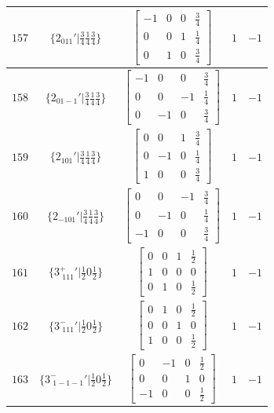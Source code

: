 \documentclass[fleqn,8pt]{jsarticle}
\begin{document}
\begin{longtable}{ccccc}
$ 157 $ & $ \{2{}_{011}{}'|\frac{3}{4} \frac{1}{4} \frac{3}{4}\} $ & $ \begin{bmatrix} -1 & 0 & 0 & \frac{3}{4} \\ 0 & 0 & 1 & \frac{1}{4} \\ 0 & 1 & 0 & \frac{3}{4} \end{bmatrix} $ & $ 1 $ & $ -1 $ \\ \hline
$ 158 $ & $ \{2{}_{01-1}{}'|\frac{3}{4} \frac{1}{4} \frac{3}{4}\} $ & $ \begin{bmatrix} -1 & 0 & 0 & \frac{3}{4} \\ 0 & 0 & -1 & \frac{1}{4} \\ 0 & -1 & 0 & \frac{3}{4} \end{bmatrix} $ & $ 1 $ & $ -1 $ \\ \hline
$ 159 $ & $ \{2{}_{101}{}'|\frac{3}{4} \frac{1}{4} \frac{3}{4}\} $ & $ \begin{bmatrix} 0 & 0 & 1 & \frac{3}{4} \\ 0 & -1 & 0 & \frac{1}{4} \\ 1 & 0 & 0 & \frac{3}{4} \end{bmatrix} $ & $ 1 $ & $ -1 $ \\ \hline
$ 160 $ & $ \{2{}_{-101}{}'|\frac{3}{4} \frac{1}{4} \frac{3}{4}\} $ & $ \begin{bmatrix} 0 & 0 & -1 & \frac{3}{4} \\ 0 & -1 & 0 & \frac{1}{4} \\ -1 & 0 & 0 & \frac{3}{4} \end{bmatrix} $ & $ 1 $ & $ -1 $ \\ \hline
$ 161 $ & $ \{3^{+}_{\,\,111}{}'|\frac{1}{2} 0 \frac{1}{2}\} $ & $ \begin{bmatrix} 0 & 0 & 1 & \frac{1}{2} \\ 1 & 0 & 0 & 0 \\ 0 & 1 & 0 & \frac{1}{2} \end{bmatrix} $ & $ 1 $ & $ -1 $ \\ \hline
$ 162 $ & $ \{3^{-}_{\,\,111}{}'|\frac{1}{2} 0 \frac{1}{2}\} $ & $ \begin{bmatrix} 0 & 1 & 0 & \frac{1}{2} \\ 0 & 0 & 1 & 0 \\ 1 & 0 & 0 & \frac{1}{2} \end{bmatrix} $ & $ 1 $ & $ -1 $ \\ \hline
$ 163 $ & $ \{3^{-}_{\,\,1-1-1}{}'|\frac{1}{2} 0 \frac{1}{2}\} $ & $ \begin{bmatrix} 0 & -1 & 0 & \frac{1}{2} \\ 0 & 0 & 1 & 0 \\ -1 & 0 & 0 & \frac{1}{2} \end{bmatrix} $ & $ 1 $ & $ -1 $ \\ \hline

\end{longtable}
\end{document}
